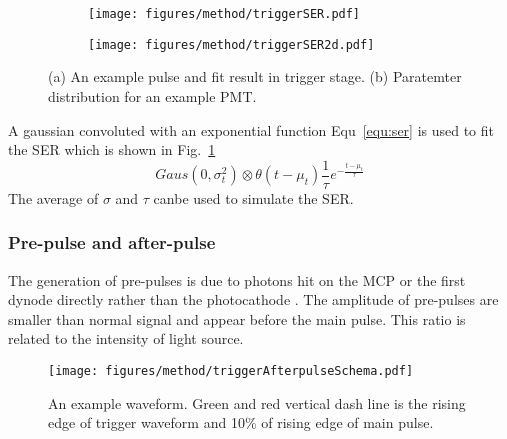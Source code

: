 \begin{figure}
    \centering
    \begin{subfigure}[t]{0.47\textwidth}
        \texttt{[image: figures/method/triggerSER.pdf]}
        \caption{}
        \label{fig:triggerser}
    \end{subfigure}
    \begin{subfigure}[t]{0.47\textwidth}
        \texttt{[image: figures/method/triggerSER2d.pdf]}
        \caption{}
        \label{fig:triggerser2d}
    \end{subfigure}
    \caption{(a) An example pulse and fit result in trigger stage. (b) Paratemter distribution for an example PMT.}
\end{figure}

A gaussian convoluted with an exponential function Equ~\eqref{equ:ser} is used to fit the SER which is shown in Fig.~\ref{fig:triggerser}
\begin{equation}
    \label{equ:ser}
    Gaus(0,\sigma_t^2)\otimes\theta(t-\mu_t)\frac{1}{\tau}e^{-\frac{t-\mu_t}{\tau}}
\end{equation}
The average of $\sigma$ and $\tau$ canbe used to simulate the SER. 
\subsubsection{Pre-pulse and after-pulse}
The generation of pre-pulses is due to photons hit on the MCP or the first dynode directly rather than the photocathode \cite{JUNOMassTesting}. The amplitude of pre-pulses are smaller than normal signal and appear before the main pulse. This ratio is related to the intensity of light source.
\begin{figure}
    \centering
    \texttt{[image: figures/method/triggerAfterpulseSchema.pdf]}
    \caption{An example waveform. Green and red vertical dash line is the rising edge of trigger waveform and 10\% of rising edge of main pulse.}
    \label{fig:afterpulseSchema}
\end{figure}

